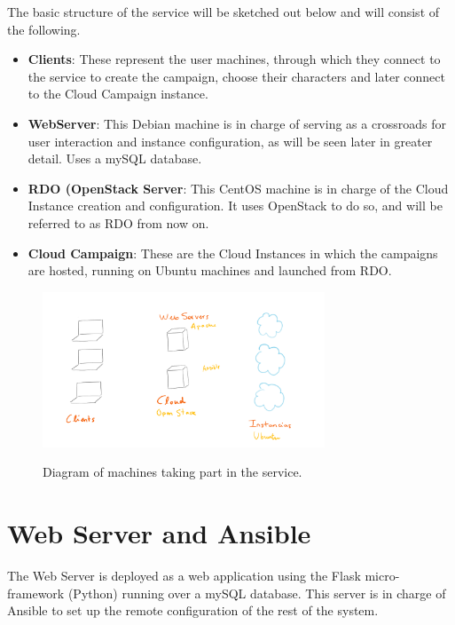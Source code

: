\documentclass[a4paper,12pt]{report}
\begin{document}
The basic structure of the service will be sketched out below and will consist of the following.
\begin{itemize}
    \item \textbf{Clients}: These represent the user machines, through which they connect to the service to create the campaign, choose their characters and later connect to the Cloud Campaign instance.
    \item \textbf{WebServer}: This Debian machine is in charge of serving as a crossroads for user interaction and instance configuration, as will be seen later in greater detail. Uses a mySQL database.
    \item \textbf{RDO (OpenStack Server}: This CentOS machine is in charge of the Cloud Instance creation and configuration. It uses OpenStack to do so, and will be referred to as RDO from now on.
    \item \textbf{Cloud Campaign}: These are the Cloud Instances in which the campaigns are hosted, running on Ubuntu machines and launched from RDO.
\end{itemize}

\begin{figure}[h!]
\caption{Diagram of machines taking part in the service.}
\centering
\includegraphics[width=0.75\textwidth]{images/Capture1.PNG}
\label{fig:diagram1}
\end{figure}



\section{Web Server and Ansible}
\label{sec:planWS}
The Web Server is deployed as a web application using the Flask micro-framework (Python) running over a mySQL database.
This server is in charge of Ansible to set up the remote configuration of the rest of the system.
\end{document}

